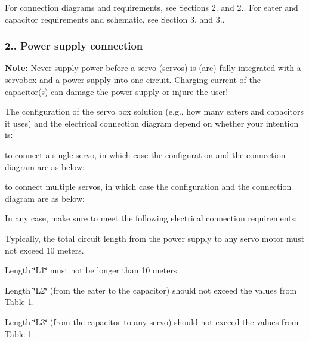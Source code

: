 For connection diagrams and requirements, see Sections 2. and 2.. For eater and capacitor requirements and schematic, see Section 3. and 3..\hypertarget{group__hw__manual_sect_21}{}\subsubsection{2.. Power supply connection}\label{group__hw__manual_sect_21}
{\bfseries Note\+:} Never supply power before a servo (servos) is (are) fully integrated with a servobox and a power supply into one circuit. Charging current of the capacitor(s) can damage the power supply or injure the user!

The configuration of the servo box solution (e.\+g., how many eaters and capacitors it uses) and the electrical connection diagram depend on whether your intention is\+:
\begin{DoxyItemize}
\item to connect a single servo, in which case the configuration and the connection diagram are as below\+: 
\item to connect multiple servos, in which case the configuration and the connection diagram are as below\+: 
\end{DoxyItemize}

In any case, make sure to meet the following electrical connection requirements\+:
\begin{DoxyItemize}
\item Typically, the total circuit length from the power supply to any servo motor must not exceed 10 meters.
\item Length \char`\"{}\+L1\char`\"{} must not be longer than 10 meters.
\item Length \char`\"{}\+L2\char`\"{} (from the eater to the capacitor) should not exceed the values from Table 1.
\item Length \char`\"{}\+L3\char`\"{} (from the capacitor to any servo) should not exceed the values from Table 1.
\end{DoxyItemize}

